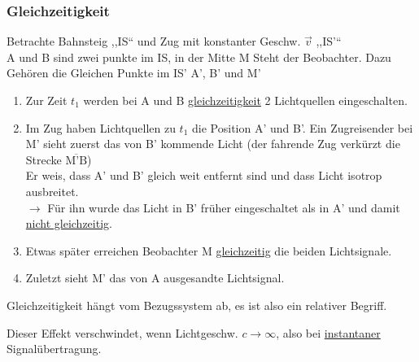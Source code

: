 \documentclass[titlepage,12pt,a4paper,ngerman]{report}
\newcommand{\tx}[1]{\textrm{#1}}
\newcommand{\rbox}[1]{\begin{tcolorbox}[colback=white,colframe=red!75!black]#1\end{tcolorbox}} %
\begin{document}
{\subsubsection{Gleichzeitigkeit}
Betrachte Bahnsteig ,,IS`` und Zug mit konstanter Geschw. $ \vec{v} $ ,,IS'``\\
A und B sind zwei punkte im IS, in der Mitte M Steht der Beobachter. Dazu Gehören die Gleichen Punkte im IS' A', B' und M'
\begin{enumerate}[1.)]
	\item Zur Zeit $ t_1 $ werden bei A und B \underline{gleichzeitigkeit} 2 Lichtquellen eingeschalten.
	\item Im Zug haben Lichtquellen zu $ t_1 $ die Position A' und B'. Ein Zugreisender bei M' sieht zuerst das von B' kommende Licht (der fahrende Zug verkürzt die Strecke $ \overline{\tx{M'B}} $) \\
	Er weis, dass A' und B' gleich weit entfernt sind und dass Licht isotrop ausbreitet.\\
	$ \rightarrow $ Für ihn wurde das Licht in B' früher eingeschaltet als in A' und damit \underline{nicht gleichzeitig}.
	\item Etwas später erreichen Beobachter M \underline{gleichzeitig} die beiden Lichtsignale.
	\item Zuletzt sieht M' das von A ausgesandte Lichtsignal.
\end{enumerate}
\rbox{Gleichzeitigkeit hängt vom Bezugssystem ab, es ist also ein relativer Begriff.}
Dieser Effekt verschwindet, wenn Lichtgeschw. $ c \rightarrow \infty $, also bei \underline{instantaner} Signalübertragung.

}
\end{document}
